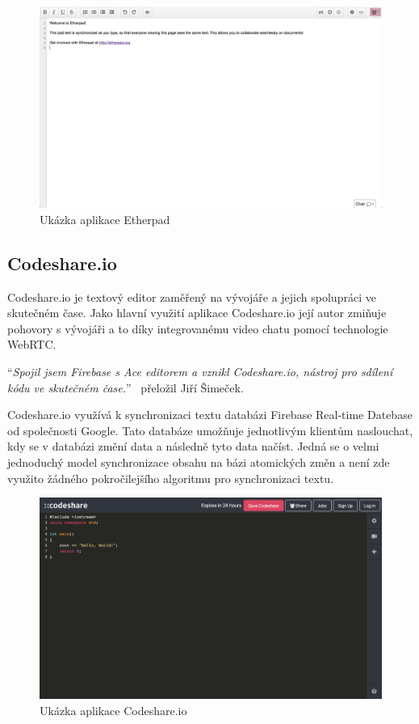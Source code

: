 \begin{figure}[ht]
    \centering
    \includegraphics[width=\textwidth]{partials/analyza/etherpad}
    \caption{Ukázka aplikace Etherpad}\label{fig:etherpad}
\end{figure}

\subsection{Codeshare.io}\label{subsec:codeshare.io}

Codeshare.io je textový editor zaměřený na vývojáře a jejich spolupráci ve skutečném čase.
Jako hlavní využití aplikace Codeshare.io její autor zmiňuje pohovory s vývojáři a to díky integrovanému video chatu pomocí technologie \gls{WebRTC}.~\cite{codeshare:home}

\enquote{\textit{Spojil jsem Firebase s Ace editorem a vznikl Codeshare.io, nástroj pro sdílení kódu ve skutečném čase.}}~\cite{codeshare:created} přeložil Jiří Šimeček.

Codeshare.io využívá k synchronizaci textu databázi Firebase Real-time Datebase od společnosti Google.
Tato databáze umožňuje jednotlivým klientům naslouchat, kdy se v databázi změní data a následně tyto data načíst.
Jedná se o velmi jednoduchý model synchronizace obsahu na bázi atomických změn a není zde využito žádného pokročilejšího algoritmu pro synchronizaci textu.~\cite{codeshare:created}

\begin{figure}[ht]
    \centering
    \includegraphics[width=\textwidth]{partials/analyza/codeshare}
    \caption{Ukázka aplikace Codeshare.io}\label{fig:codeshare}
\end{figure}
